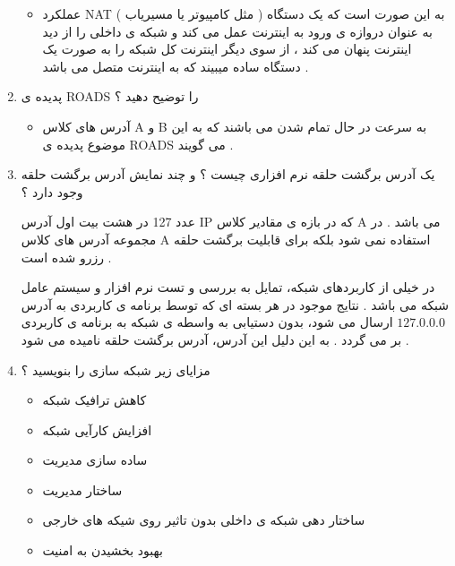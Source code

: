 \documentclass{article}
\begin{document}
\begin{enumerate}
\begin{tcolorbox}
\begin{itemize}
	\item عملکرد NAT
	به این صورت است که یک دستگاه ( مثل کامپیوتر یا مسیریاب ) به عنوان دروازه ی ورود به اینترنت عمل می کند و شبکه ی داخلی را از دید اینترنت پنهان می کند ، از سوی دیگر اینترنت کل شبکه را به صورت یک دستگاه ساده میبیند که به اینترنت متصل می باشد .
\end{itemize}
\end{tcolorbox}



\newpage

\item پدیده ی ROADS را توضیح دهید ؟

\begin{tcolorbox}
\begin{itemize}
	\item آدرس های کلاس A و B
	به سرعت در حال تمام شدن می باشند که به این موضوع پدیده ی ROADS  می گویند .
\end{itemize}
\end{tcolorbox}

\item یک آدرس برگشت حلقه نرم افزاری چیست ؟ و چند نمایش آدرس برگشت حلقه وجود دارد ؟

\begin{tcolorbox}
عدد 127 در هشت بیت اول آدرس IP
که در بازه ی مقادیر کلاس A می باشد . در مجموعه آدرس های کلاس A استفاده نمی شود بلکه برای قابلیت برگشت حلقه رزرو شده است .

در خیلی از کاربردهای شبکه، تمایل به بررسی و تست نرم افزار و سیستم عامل شبکه می باشد .
نتایج موجود در هر بسته ای که توسط برنامه ی کاربردی به آدرس 
$127.0.0.0$
ارسال می شود، بدون دستیابی به واسطه ی شبکه به برنامه ی کاربردی بر می گردد .
به این دلیل این آدرس، آدرس برگشت حلقه نامیده می شود .
\end{tcolorbox}

\item مزایای زیر شبکه سازی را بنویسید ؟

\begin{tcolorbox}
\begin{itemize}
	\item کاهش ترافیک شبکه
	\item افزایش کارآیی شبکه
	\item ساده سازی مدیریت
	\item ساختار مدیریت
	\item ساختار دهی شبکه ی داخلی بدون تاثیر روی شیکه های خارجی
	\item بهبود بخشیدن به امنیت
\end{itemize}
\end{tcolorbox}


\end{enumerate}
\end{document}
